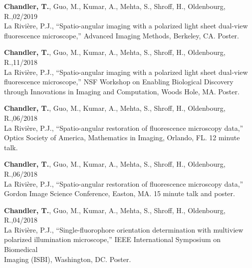 \documentclass[12pt,letterpaper]{article}
\begin{document}
\begin{benumerate}{10}
\item {\textbf{Chandler, T.}, Guo, M., Kumar, A., Mehta, S., Shroff, H., Oldenbourg, R.,\hfill 02/2019\\ La Rivi\`ere, P.J., ``Spatio-angular imaging with a polarized light sheet dual-view\\ fluorescence microscope,'' Advanced Imaging Methods, Berkeley, CA. Poster.}

\item {\textbf{Chandler, T.}, Guo, M., Kumar, A., Mehta, S., Shroff, H., Oldenbourg, R.,\hfill 11/2018\\ La Rivi\`ere, P.J., ``Spatio-angular imaging with a polarized light sheet dual-view \\ fluorescence microscope,'' NSF Workshop on Enabling Biological Discovery\\ through Innovations in Imaging and Computation, Woods Hole, MA. Poster.}
  
\item {\textbf{Chandler, T.}, Guo, M., Kumar, A., Mehta, S., Shroff, H., Oldenbourg, R.,\hfill 06/2018\\ La Rivi\`ere, P.J., ``Spatio-angular restoration of fluorescence microscopy data,'' \\
      Optics Society of America, Mathematics in Imaging, Orlando, FL. 12 minute talk.}
  
\item {\textbf{Chandler, T.}, Guo, M., Kumar, A., Mehta, S., Shroff, H., Oldenbourg, R.,\hfill 06/2018\\ La Rivi\`ere, P.J., ``Spatio-angular restoration of fluorescence microscopy data,''\\
      Gordon Image Science Conference, Easton, MA. 15 minute talk and poster.}

\item {\textbf{Chandler, T.}, Guo, M., Kumar, A., Mehta, S., Shroff, H., Oldenbourg, R.,\hfill 04/2018\\ La Rivi\`ere, P.J., ``Single-fluorophore orientation determination with multiview\\ polarized
      illumination microscope,'' IEEE International Symposium on Biomedical\\ Imaging (ISBI), Washington, DC. Poster.}
\end{benumerate}
\end{document}
